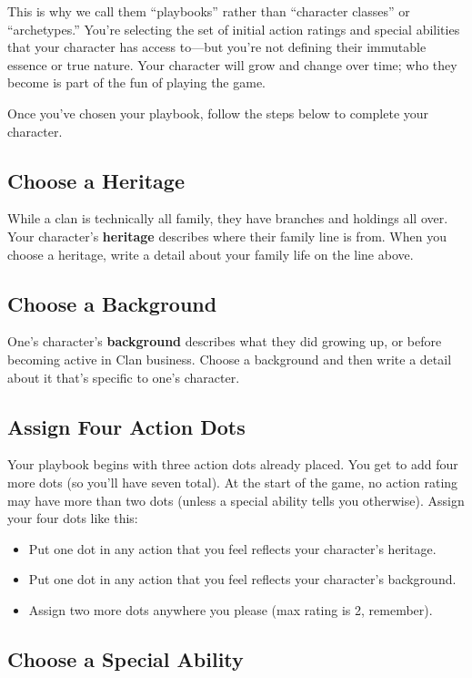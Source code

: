 This is why we call them ``playbooks'' rather than ``character classes'' or ``archetypes.'' You’re selecting the set of initial action ratings and special abilities that your character has access to---but you’re not defining their immutable essence or true nature. Your character will grow and change over time; who they become is part of the fun of playing the game.

Once you’ve chosen your playbook, follow the steps below to complete your character.

\subsection{Choose a Heritage}

While a clan is technically all family, they have branches and holdings all over. Your character’s \textbf{heritage} describes where their family line is from. When you choose a heritage, write a detail about your family life on the line above.

\subsection{Choose a Background}

One's character's \textbf{background} describes what they did growing up, or before becoming active in Clan business. Choose a background and then write a detail about it that's specific to one's character.

\subsection{Assign Four Action Dots}

Your playbook begins with three action dots already placed. You get to add four more dots (so you’ll have seven total). At the start of the game, no action rating may have more than two dots (unless a special ability tells you otherwise). Assign your four dots like this:

\begin{itemize}
\item Put one dot in any action that you feel reflects your character’s heritage.
\item Put one dot in any action that you feel reflects your character’s background.
\item Assign two more dots anywhere you please (max rating is 2, remember).
\end{itemize}

\subsection{Choose a Special Ability}

